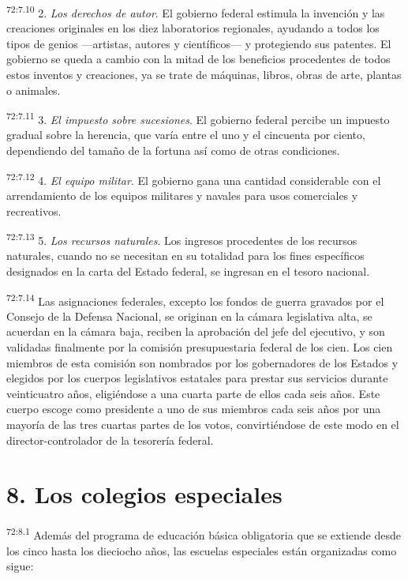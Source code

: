 \documentclass[twoside, 11pt]{book}
\begin{document}
\par
\textsuperscript{72:7.10} 2. \textit{Los derechos de autor}. El gobierno federal estimula la invención y las creaciones originales en los diez laboratorios regionales, ayudando a todos los tipos de genios ---artistas, autores y científicos--- y protegiendo sus patentes. El gobierno se queda a cambio con la mitad de los beneficios procedentes de todos estos inventos y creaciones, ya se trate de máquinas, libros, obras de arte, plantas o animales.

\par
\textsuperscript{72:7.11} 3. \textit{El impuesto sobre sucesiones}. El gobierno federal percibe un impuesto gradual sobre la herencia, que varía entre el uno y el cincuenta por ciento, dependiendo del tamaño de la fortuna así como de otras condiciones.

\par
\textsuperscript{72:7.12} 4. \textit{El equipo militar}. El gobierno gana una cantidad considerable con el arrendamiento de los equipos militares y navales para usos comerciales y recreativos.

\par
\textsuperscript{72:7.13} 5. \textit{Los recursos naturales}. Los ingresos procedentes de los recursos naturales, cuando no se necesitan en su totalidad para los fines específicos designados en la carta del Estado federal, se ingresan en el tesoro nacional.

\par
\textsuperscript{72:7.14} Las asignaciones federales, excepto los fondos de guerra gravados por el Consejo de la Defensa Nacional, se originan en la cámara legislativa alta, se acuerdan en la cámara baja, reciben la aprobación del jefe del ejecutivo, y son validadas finalmente por la comisión presupuestaria federal de los cien. Los cien miembros de esta comisión son nombrados por los gobernadores de los Estados y elegidos por los cuerpos legislativos estatales para prestar sus servicios durante veinticuatro años, eligiéndose a una cuarta parte de ellos cada seis años. Este cuerpo escoge como presidente a uno de sus miembros cada seis años por una mayoría de las tres cuartas partes de los votos, convirtiéndose de este modo en el director-controlador de la tesorería federal.

\section*{8. Los colegios especiales}
\par
\textsuperscript{72:8.1} Además del programa de educación básica obligatoria que se extiende desde los cinco hasta los dieciocho años, las escuelas especiales están organizadas como sigue:
\end{document}

